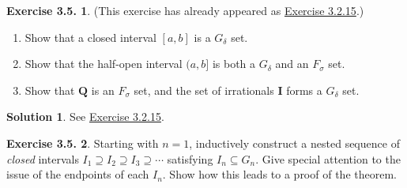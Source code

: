 \documentclass[12pt]{article}
\theoremstyle{definition}
\theoremstyle{exercise}
\newtheorem{exercise}{Exercise 3.5.}
\theoremstyle{solution}
\newtheorem*{solution}{Solution}
\newcommand{\Q}{\mathbf{Q}}
\newcommand{\I}{\mathbf{I}}
\begin{document}
\begin{exercise}
\label{ex:3}
    (This exercise has already appeared as \href{https://lew98.github.io/Mathematics/UA_Section_3_2_Exercises.pdf}{Exercise 3.2.15}.)
    \begin{enumerate}
        \item Show that a closed interval \( [a, b] \) is a \( G_{\delta} \) set.
        
        \item Show that the half-open interval \( (a, b] \) is both a \( G_{\delta} \) and an \( F_{\sigma} \) set.

        \item Show that \( \Q \) is an \( F_{\sigma} \) set, and the set of irrationals \( \I \) forms a \( G_{\delta} \) set.
    \end{enumerate}
\end{exercise}

\begin{solution}
    See \href{https://lew98.github.io/Mathematics/UA_Section_3_2_Exercises.pdf}{Exercise 3.2.15}.
\end{solution}

\begin{exercise}
\label{ex:4}
    Starting with \( n = 1 \), inductively construct a nested sequence of \textit{closed} intervals \( I_1 \supseteq I_2 \supseteq I_3 \supseteq \cdots \) satisfying \( I_n \subseteq G_n \). Give special attention to the issue of the endpoints of each \( I_n \). Show how this leads to a proof of the theorem.
\end{exercise}
\end{document}
